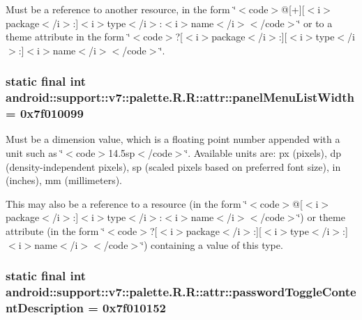 Must be a reference to another resource, in the form \char`\"{}$<$code$>$@\mbox{[}+\mbox{]}\mbox{[}$<$i$>$package$<$/i$>$:\mbox{]}$<$i$>$type$<$/i$>$:$<$i$>$name$<$/i$>$$<$/code$>$\char`\"{} or to a theme attribute in the form \char`\"{}$<$code$>$?\mbox{[}$<$i$>$package$<$/i$>$:\mbox{]}\mbox{[}$<$i$>$type$<$/i$>$:\mbox{]}$<$i$>$name$<$/i$>$$<$/code$>$\char`\"{}. \hypertarget{classandroid_1_1support_1_1v7_1_1palette_1_1_r_1_1attr_fcb2d75fb21c33c1e1a32409796663cf}{
\subsubsection[{panelMenuListWidth}]{\setlength{\rightskip}{0pt plus 5cm}static final int android::support::v7::palette.R.R::attr::panelMenuListWidth = 0x7f010099}}
\label{classandroid_1_1support_1_1v7_1_1palette_1_1_r_1_1attr_fcb2d75fb21c33c1e1a32409796663cf}


Must be a dimension value, which is a floating point number appended with a unit such as \char`\"{}$<$code$>$14.5sp$<$/code$>$\char`\"{}. Available units are: px (pixels), dp (density-independent pixels), sp (scaled pixels based on preferred font size), in (inches), mm (millimeters). 

This may also be a reference to a resource (in the form \char`\"{}$<$code$>$@\mbox{[}$<$i$>$package$<$/i$>$:\mbox{]}$<$i$>$type$<$/i$>$:$<$i$>$name$<$/i$>$$<$/code$>$\char`\"{}) or theme attribute (in the form \char`\"{}$<$code$>$?\mbox{[}$<$i$>$package$<$/i$>$:\mbox{]}\mbox{[}$<$i$>$type$<$/i$>$:\mbox{]}$<$i$>$name$<$/i$>$$<$/code$>$\char`\"{}) containing a value of this type. \hypertarget{classandroid_1_1support_1_1v7_1_1palette_1_1_r_1_1attr_81ad5aac4a6bd86b8d4519dd085c7d3c}{
\subsubsection[{passwordToggleContentDescription}]{\setlength{\rightskip}{0pt plus 5cm}static final int android::support::v7::palette.R.R::attr::passwordToggleContentDescription = 0x7f010152}}
\label{classandroid_1_1support_1_1v7_1_1palette_1_1_r_1_1attr_81ad5aac4a6bd86b8d4519dd085c7d3c}


